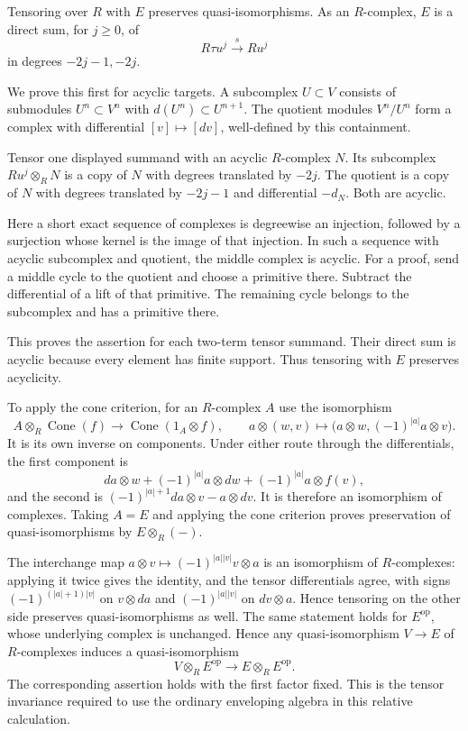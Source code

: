 Tensoring over $R$ with $E$ preserves quasi-isomorphisms.
As an $R$-complex, $E$ is a direct sum, for $j\geq0$, of
\[
 R\tau u^j\xrightarrow{\ s\ }Ru^j
\]
in degrees $-2j-1,-2j$.

We prove this first for acyclic targets.
A subcomplex $U\subset V$ consists of submodules $U^n\subset V^n$
with $d(U^n)\subset U^{n+1}$.
The quotient modules $V^n/U^n$ form a complex with differential
$[v]\mapsto[dv]$, well-defined by this containment.

Tensor one displayed summand with an acyclic $R$-complex $N$.
Its subcomplex $Ru^j\otimes_R N$ is a copy of $N$ with degrees translated
by $-2j$. The quotient is a copy of $N$ with degrees translated by
$-2j-1$ and differential $-d_N$.
Both are acyclic.

Here a short exact sequence of complexes is degreewise an injection,
followed by a surjection whose kernel is the image of that injection.
In such a sequence with acyclic subcomplex and quotient, the middle
complex is acyclic.
For a proof, send a middle cycle to the quotient and choose a primitive
there. Subtract the differential of a lift of that primitive.
The remaining cycle belongs to the subcomplex and has a primitive there.

This proves the assertion for each two-term tensor summand.
Their direct sum is acyclic because every element has finite support.
Thus tensoring with $E$ preserves acyclicity.

To apply the cone criterion, for an $R$-complex $A$ use the isomorphism
\[
 A\otimes_R\operatorname{Cone}(f)\longrightarrow
 \operatorname{Cone}(1_A\otimes f),\qquad
 a\otimes(w,v)\longmapsto
 \bigl(a\otimes w,(-1)^{|a|}a\otimes v\bigr).
\]
It is its own inverse on components. Under either route through the
differentials, the first component is
\[
 da\otimes w+(-1)^{|a|}a\otimes dw+(-1)^{|a|}a\otimes f(v),
\]
and the second is $(-1)^{|a|+1}da\otimes v-a\otimes dv$.
It is therefore an isomorphism of complexes.
Taking $A=E$ and applying the cone criterion proves preservation of
quasi-isomorphisms by $E\otimes_R(-)$.

The interchange map $a\otimes v\mapsto(-1)^{|a||v|}v\otimes a$
is an isomorphism of $R$-complexes: applying it twice gives the identity,
and the tensor differentials agree, with signs
$(-1)^{(|a|+1)|v|}$ on $v\otimes da$ and
$(-1)^{|a||v|}$ on $dv\otimes a$.
Hence tensoring on the other side preserves quasi-isomorphisms as well.
The same statement holds for $E^{\mathrm{op}}$, whose underlying complex
is unchanged. Hence any quasi-isomorphism $V\to E$ of $R$-complexes
induces a quasi-isomorphism
\[
 V\otimes_R E^{\mathrm{op}}\longrightarrow
 E\otimes_R E^{\mathrm{op}}.
\]
The corresponding assertion holds with the first factor fixed.
This is the tensor invariance required to use the ordinary enveloping
algebra in this relative calculation.

